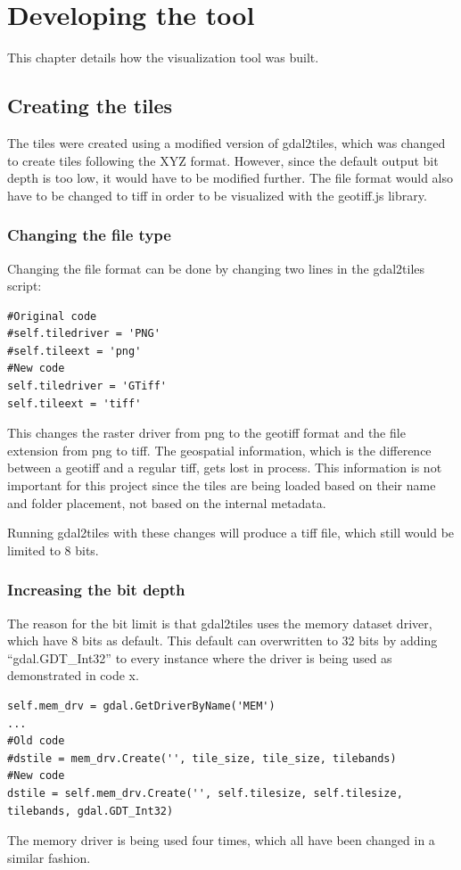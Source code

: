\chapter{Developing the tool}
This chapter details how the visualization tool was built.

\section{Creating the tiles}
The tiles were created using a modified version of gdal2tiles, which was changed to create tiles following the XYZ format. However, since the default output bit depth is too low, it would have to be modified further. The file format would also have to be changed to tiff in order to be visualized with the geotiff.js library. 

\subsection{Changing the file type}
Changing the file format can be done by changing two lines in the gdal2tiles script:

\begin{lstlisting}[language=iPython, caption={Changing the file format}, label= VoresPY,escapechar=|]
#Original code
#self.tiledriver = 'PNG'
#self.tileext = 'png'
#New code
self.tiledriver = 'GTiff'
self.tileext = 'tiff'
\end{lstlisting}
This changes the raster driver from png to the geotiff format and the file extension from png to tiff. 
\citep{RasterDrivers}
The geospatial information, which is the difference between a geotiff and a regular tiff, gets lost in process. This information is not important for this project since the tiles are being loaded based on their name and folder placement, not based on the internal metadata.

Running gdal2tiles with these changes will produce a tiff file, which still would be limited to 8 bits. 
\subsection{Increasing the bit depth}
The reason for the bit limit is that gdal2tiles uses the memory dataset driver, which have 8 bits as default.  This default can overwritten to 32 bits by adding “gdal.GDT\_Int32” to every instance where the driver is being used as demonstrated in code x. 
\citep{MoreThan8}

\begin{lstlisting}[language=iPython, caption={Increasing the bit depth}, label= VoresPY,escapechar=|]
self.mem_drv = gdal.GetDriverByName('MEM')
...
#Old code
#dstile = mem_drv.Create('', tile_size, tile_size, tilebands)
#New code
dstile = self.mem_drv.Create('', self.tilesize, self.tilesize, tilebands, gdal.GDT_Int32)
\end{lstlisting}
The memory driver is being used four times, which all have been changed in a similar fashion.


